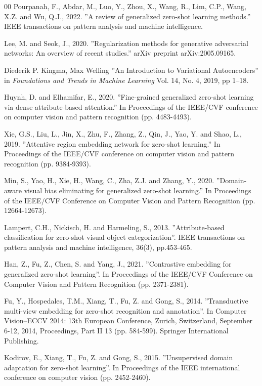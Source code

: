 \documentclass{article}
\begin{document}
\begin{thebibliography}{00}
 Pourpanah, F., Abdar, M., Luo, Y., Zhou, X., Wang, R., Lim, C.P., Wang, X.Z. and Wu, Q.J., 2022. ''A review of generalized zero-shot learning methods.'' IEEE transactions on pattern analysis and machine intelligence.

 Lee, M. and Seok, J., 2020. ''Regularization methods for generative adversarial networks: An overview of recent studies.'' arXiv preprint arXiv:2005.09165.

 Diederik P. Kingma, Max Welling ''An Introduction to Variational Autoencoders'' in \emph{Foundations and Trends in Machine Learning} Vol. 14, No. 4, 2019, pp 1–18.

 Huynh, D. and Elhamifar, E., 2020. ''Fine-grained generalized zero-shot learning via dense attribute-based attention.'' In Proceedings of the IEEE/CVF conference on computer vision and pattern recognition (pp. 4483-4493).

 Xie, G.S., Liu, L., Jin, X., Zhu, F., Zhang, Z., Qin, J., Yao, Y. and Shao, L., 2019. ''Attentive region embedding network for zero-shot learning.'' In Proceedings of the IEEE/CVF conference on computer vision and pattern recognition (pp. 9384-9393).

 Min, S., Yao, H., Xie, H., Wang, C., Zha, Z.J. and Zhang, Y., 2020. ''Domain-aware visual bias eliminating for generalized zero-shot learning.'' In Proceedings of the IEEE/CVF Conference on Computer Vision and Pattern Recognition (pp. 12664-12673).

 Lampert, C.H., Nickisch, H. and Harmeling, S., 2013. ''Attribute-based classification for zero-shot visual object categorization''. IEEE transactions on pattern analysis and machine intelligence, 36(3), pp.453-465.

 Han, Z., Fu, Z., Chen, S. and Yang, J., 2021. ''Contrastive embedding for generalized zero-shot learning''. In Proceedings of the IEEE/CVF Conference on Computer Vision and Pattern Recognition (pp. 2371-2381).

 Fu, Y., Hospedales, T.M., Xiang, T., Fu, Z. and Gong, S., 2014. ''Transductive multi-view embedding for zero-shot recognition and annotation''. In Computer Vision–ECCV 2014: 13th European Conference, Zurich, Switzerland, September 6-12, 2014, Proceedings, Part II 13 (pp. 584-599). Springer International Publishing.

 Kodirov, E., Xiang, T., Fu, Z. and Gong, S., 2015. ''Unsupervised domain adaptation for zero-shot learning''. In Proceedings of the IEEE international conference on computer vision (pp. 2452-2460).


\end{thebibliography}
\end{document}
